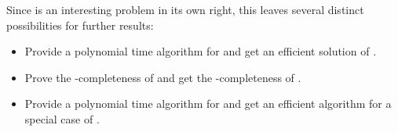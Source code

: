 Since \probMul is an interesting problem in its own right, this leaves several
distinct possibilities for further results:
\begin{itemize}
\item Provide a polynomial time algorithm for  \probPTree and get an efficient solution of \probMul.
\item Prove the \NP-completeness of \probMul and get the \NP-completeness of \probPTree.
\item Provide a polynomial time algorithm for \probMul and get an efficient algorithm for a special case of \probPTree.
\end{itemize}